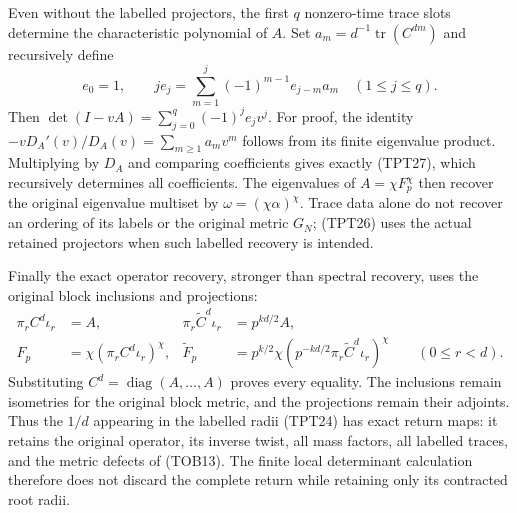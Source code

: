 Even without the labelled projectors, the first $q$ nonzero-time trace
slots determine the characteristic polynomial of $A$. Set
$a_m=d^{-1}\operatorname{tr}(C^{dm})$ and recursively define
\begin{equation}\tag{TPT27}
 e_0=1,\qquad
 j e_j=\sum_{m=1}^j(-1)^{m-1}e_{j-m}a_m
       \quad(1\le j\le q).
\end{equation}
Then $\det(I-vA)=\sum_{j=0}^q(-1)^je_jv^j$.
For proof, the identity
$-vD_A'(v)/D_A(v)=\sum_{m\ge1}a_mv^m$ follows from its finite
eigenvalue product. Multiplying by $D_A$ and comparing coefficients
gives exactly (TPT27), which recursively determines all coefficients.
The eigenvalues of $A=\chi F_p^\chi$ then recover the original
eigenvalue multiset by $\omega=(\chi\alpha)^\chi$.
Trace data alone do not recover an ordering of its labels or the
original metric $G_N$; (TPT26) uses the actual retained projectors
when such labelled recovery is intended.

Finally the exact operator recovery, stronger than spectral recovery,
uses the original block inclusions and projections:
\begin{equation}\tag{TPT28}
 \begin{aligned}
 \pi_r C^d\iota_r&=A,&
 \pi_r\widetilde C^d\iota_r&=p^{kd/2}A,\\
 F_p&=\chi(\pi_r C^d\iota_r)^\chi,&
 \widetilde F_p
   &=p^{k/2}\chi
         (p^{-kd/2}\pi_r\widetilde C^d\iota_r)^\chi
          \qquad(0\le r<d).
 \end{aligned}
\end{equation}
Substituting $C^d=\operatorname{diag}(A,\ldots,A)$ proves every
equality. The inclusions remain isometries for the original block
metric, and the projections remain their adjoints. Thus the
$1/d$ appearing in the labelled radii (TPT24) has exact return maps:
it retains the original operator, its inverse twist, all mass
factors, all labelled traces, and the metric defects of (TOB13).
The finite local determinant calculation therefore does not discard
the complete return while retaining only its contracted root radii.
